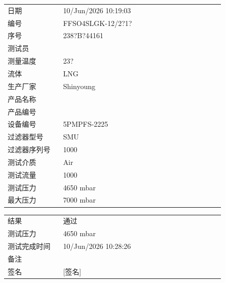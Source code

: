 \documentclass[UTF8,10pt,a4paper,fontset=fandol]{ctexart}
\newcommand{\fieldvalue}[1]{#1}
\newcommand{\handwritten}[1]{#1}
\begin{document}
\begin{tabular}{@{}p{0.23\linewidth}p{0.67\linewidth}@{}}
日期 & 
\fieldvalue{10/Jun/2026 10:19:03} \\[2pt]
编号 &
\fieldvalue{FFSO4SLGK-12/2?1?} \\[2pt]
序号 &
\fieldvalue{238?B?44161} \\[2pt]
测试员 &
\fieldvalue{} \\[2pt]
测量温度 &
\fieldvalue{23?} \\[2pt]
流体 &
\fieldvalue{LNG} \\[2pt]
生产厂家 &
\fieldvalue{Shinyoung} \\[2pt]
产品名称 &
\fieldvalue{} \\[2pt]
产品编号 &
\fieldvalue{} \\[2pt]
设备编号 &
\fieldvalue{5PMPFS-2225} \\[2pt]
过滤器型号 &
\fieldvalue{SMU} \\[2pt]
过滤器序列号 &
\fieldvalue{1000} \\[2pt]
测试介质 &
\fieldvalue{Air} \\[2pt]
测试流量 &
\fieldvalue{1000} \\[2pt]
测试压力 &
\fieldvalue{4650 mbar} \\[2pt]
最大压力 &
\fieldvalue{7000 mbar}
\end{tabular}

\bigskip

\begin{tabular}{@{}p{0.23\linewidth}p{0.67\linewidth}@{}}
结果 &
\fieldvalue{通过} \\[2pt]
测试压力 &
\fieldvalue{4650 mbar} \\[2pt]
测试完成时间 &
\fieldvalue{10/Jun/2026 10:28:26} \\[2pt]
备注 & \\[2pt]
签名 &
\fieldvalue{\handwritten{[签名]}}
\end{tabular}
\end{document}
